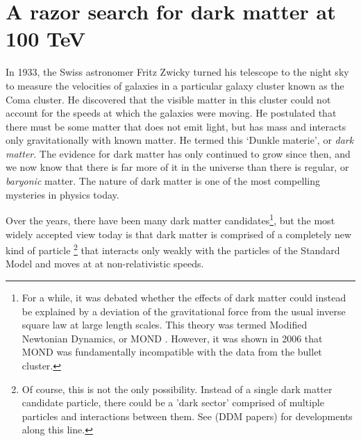\chapter{A razor search for dark matter at 100 TeV}\label{ch:DM_100_TeV}

In 1933, the Swiss astronomer Fritz Zwicky turned his telescope to the night sky to measure the velocities of galaxies in a particular galaxy cluster known as the Coma cluster. He discovered that the visible matter in this cluster could not account for the speeds at which the galaxies were moving. He postulated that there must be some matter that does not emit light, but has mass and interacts only gravitationally with known matter. He termed this `Dunkle materie', or \emph{dark matter}. The evidence for dark matter has only continued to grow since then, and we now know that there is far more of it in the universe than there is regular, or \emph{baryonic} matter. The nature of dark matter is one of the most compelling mysteries in physics today.

Over the years, there have been many dark matter candidates\footnote{For a while, it was debated whether the effects of dark matter could instead be explained by a deviation of the gravitational force from the usual inverse square law at large length scales. This theory was termed Modified Newtonian Dynamics, or MOND \citep{Milgrom1983}. However, it was shown in 2006 \citep{Clowe2006} that MOND was fundamentally incompatible with the data from the bullet cluster.}, but the most widely accepted view today is that dark matter is comprised of a completely new kind of particle \footnote{Of course, this is not the only possibility. Instead of a single dark matter candidate particle, there could be a 'dark sector' comprised of multiple particles and interactions between them. See (DDM papers) for developments along this line.} that interacts only weakly with the particles of the Standard Model and moves at at non-relativistic speeds.

